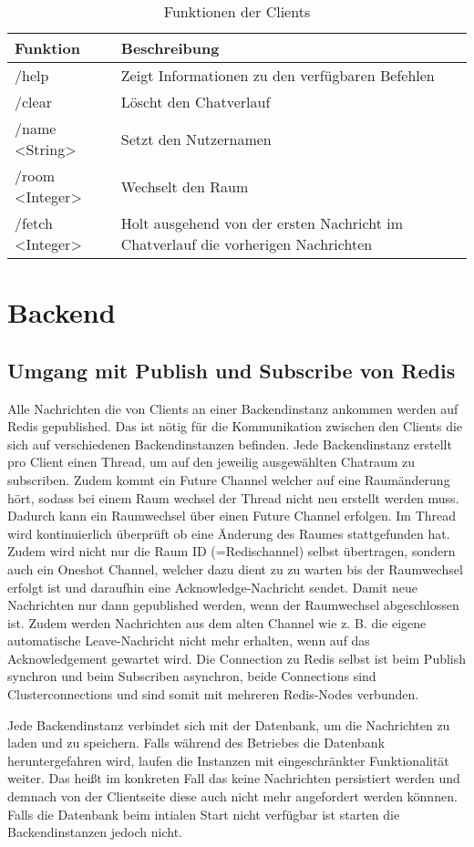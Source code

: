 \begin{table}[h!]
\begin{center}
\begin{tabular}{ | l | m{10cm} | }
\hline
\textbf{Funktion} & \textbf{Beschreibung} \\ 
\hline
/help & Zeigt Informationen zu den verfügbaren Befehlen \\ 
\hline
/clear & Löscht den Chatverlauf \\ 
\hline
/name <String> & Setzt den Nutzernamen \\ 
\hline
/room <Integer> & Wechselt den Raum \\ 
\hline
/fetch <Integer> & Holt ausgehend von der ersten Nachricht im Chatverlauf die vorherigen Nachrichten \\ 
\hline
\end{tabular}
\end{center}
\caption{Funktionen der Clients}
\label{tab:clientcommands}
\end{table}

\section{Backend}
\subsection{Umgang mit Publish und Subscribe von Redis}
Alle Nachrichten die von Clients an einer Backendinstanz ankommen werden auf Redis gepublished.
Das ist nötig für die Kommunikation zwischen den Clients die sich auf verschiedenen Backendinstanzen befinden.
Jede Backendinstanz erstellt pro Client einen Thread, um auf den jeweilig ausgewählten Chatraum zu subscriben.
Zudem kommt ein Future Channel welcher auf eine Raumänderung hört, sodass bei einem Raum wechsel der Thread nicht neu erstellt werden muss.
Dadurch kann ein Raumwechsel über einen Future Channel erfolgen. Im Thread wird kontinuierlich überprüft ob eine Änderung des Raumes stattgefunden hat.
Zudem wird nicht nur die Raum ID (=Redischannel) selbst übertragen, sondern auch ein Oneshot Channel, welcher dazu dient zu zu warten bis der Raumwechsel erfolgt ist und daraufhin eine Acknowledge-Nachricht sendet.
Damit neue Nachrichten nur dann gepublished werden, wenn der Raumwechsel abgeschlossen ist.
Zudem werden Nachrichten aus dem alten Channel wie z. B. die eigene automatische Leave-Nachricht nicht mehr erhalten, wenn auf das Acknowledgement gewartet wird.
Die Connection zu Redis selbst ist beim Publish synchron und beim Subscriben asynchron, beide Connections sind Clusterconnections und sind somit mit mehreren Redis-Nodes verbunden.

Jede Backendinstanz verbindet sich mit der Datenbank, um die Nachrichten zu laden und zu speichern.
Falls während des Betriebes die Datenbank heruntergefahren wird, laufen die Instanzen mit eingeschränkter Funktionalität weiter.
Das heißt im konkreten Fall das keine Nachrichten persistiert werden und demnach von der Clientseite diese auch nicht mehr angefordert werden könnnen.
Falls die Datenbank beim intialen Start nicht verfügbar ist starten die Backendinstanzen jedoch nicht.
